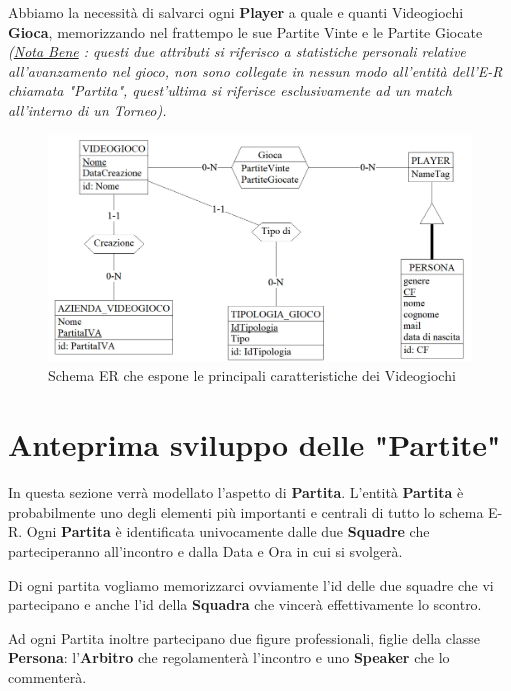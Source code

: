 \documentclass[a4paper,12pt]{report}
\begin{document}
 Abbiamo la necessità di salvarci ogni \textbf{Player} a quale e quanti Videogiochi \textbf{Gioca}, memorizzando nel frattempo le sue Partite Vinte e le Partite Giocate \textit{(\underline{Nota Bene} : questi due attributi si riferisco a statistiche personali relative all'avanzamento nel gioco, non sono collegate in nessun modo all'entità dell'E-R chiamata "Partita", quest'ultima si riferisce esclusivamente ad un match all'interno di un Torneo).}
\begin{figure}[!htb]
	\centerline{\includegraphics[scale=0.55]{img/ER_Videogiochi.png}}
	\caption{Schema ER che espone le principali caratteristiche dei Videogiochi}
	\label{img:ER_Videogiochi}
\end{figure}
\section{Anteprima sviluppo delle "Partite"}
In questa sezione verrà modellato l'aspetto di \textbf{Partita}.
L'entità \textbf{Partita} è probabilmente uno degli elementi più importanti e centrali di tutto lo schema E-R. Ogni \textbf{Partita} è identificata univocamente dalle due \textbf{Squadre} che parteciperanno all'incontro e dalla Data e Ora in cui si svolgerà.

Di ogni partita vogliamo memorizzarci ovviamente l'id delle due squadre che vi partecipano e anche l'id della \textbf{Squadra} che vincerà effettivamente lo scontro.

Ad ogni Partita inoltre partecipano due figure professionali, figlie della classe \textbf{Persona}: l'\textbf{Arbitro} che regolamenterà l'incontro e uno \textbf{Speaker} che lo commenterà.\\
\end{document}
